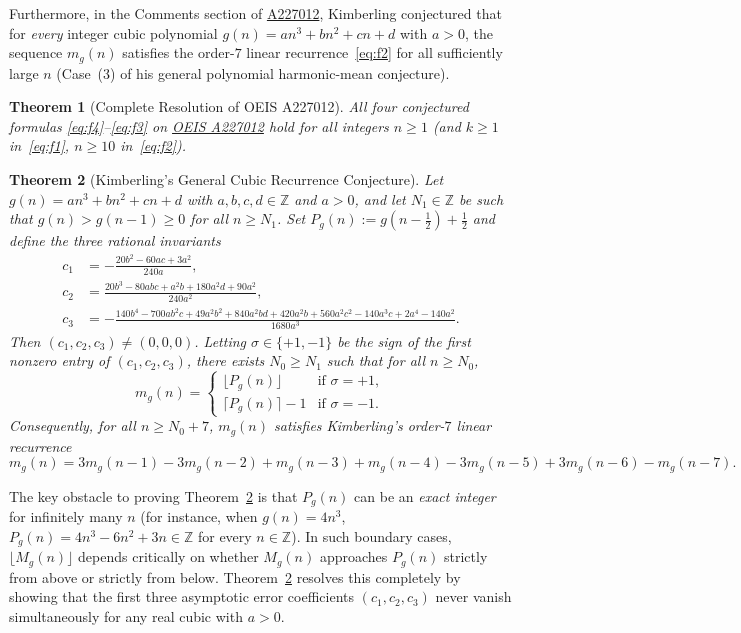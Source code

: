 \documentclass[11pt,a4paper]{article}
\newtheorem{theorem}{Theorem}
\theoremstyle{remark}
\begin{document}
Furthermore, in the Comments section of \href{https://oeis.org/A227012}{A227012}, Kimberling conjectured that for \emph{every} integer cubic polynomial $g(n) = an^3 + bn^2 + cn + d$ with $a > 0$, the sequence $m_g(n)$ satisfies the order-$7$ linear recurrence~\eqref{eq:f2} for all sufficiently large $n$ (Case~(3) of his general polynomial harmonic-mean conjecture).

\begin{theorem}[Complete Resolution of OEIS A227012]\label{thm:a227012}
All four conjectured formulas \eqref{eq:f4}--\eqref{eq:f3} on \href{https://oeis.org/A227012}{OEIS A227012} hold for all integers $n \ge 1$ (and $k \ge 1$ in~\eqref{eq:f1}, $n \ge 10$ in~\eqref{eq:f2}).
\end{theorem}

\begin{theorem}[Kimberling's General Cubic Recurrence Conjecture]\label{thm:general-cubic}
Let $g(n) = an^3 + bn^2 + cn + d$ with $a,b,c,d \in \mathbb{Z}$ and $a > 0$, and let $N_1 \in \mathbb{Z}$ be such that $g(n) > g(n-1) \ge 0$ for all $n \ge N_1$. Set $P_g(n) := g(n - \frac{1}{2}) + \frac{1}{2}$ and define the three rational invariants
\begin{align*}
  c_1 &= -\frac{20b^2 - 60ac + 3a^2}{240a}, \\
  c_2 &= \frac{20b^3 - 80abc + a^2b + 180a^2d + 90a^2}{240a^2}, \\
  c_3 &= -\frac{140b^4 - 700ab^2c + 49a^2b^2 + 840a^2bd + 420a^2b + 560a^2c^2 - 140a^3c + 2a^4 - 140a^2}{1680a^3}.
\end{align*}
Then $(c_1, c_2, c_3) \neq (0, 0, 0)$. Letting $\sigma \in \{+1, -1\}$ be the sign of the first nonzero entry of $(c_1, c_2, c_3)$, there exists $N_0 \ge N_1$ such that for all $n \ge N_0$,
\begin{equation}\label{eq:general-floor}
  m_g(n) = \begin{cases}
    \lfloor P_g(n) \rfloor & \text{if } \sigma = +1, \\
    \lceil P_g(n) \rceil - 1 & \text{if } \sigma = -1.
  \end{cases}
\end{equation}
Consequently, for all $n \ge N_0 + 7$, $m_g(n)$ satisfies Kimberling's order-$7$ linear recurrence
\[
  m_g(n) = 3m_g(n-1) - 3m_g(n-2) + m_g(n-3) + m_g(n-4) - 3m_g(n-5) + 3m_g(n-6) - m_g(n-7).
\]
\end{theorem}

The key obstacle to proving Theorem~\ref{thm:general-cubic} is that $P_g(n)$ can be an \emph{exact integer} for infinitely many $n$ (for instance, when $g(n) = 4n^3$, $P_g(n) = 4n^3 - 6n^2 + 3n \in \mathbb{Z}$ for every $n \in \mathbb{Z}$). In such boundary cases, $\lfloor M_g(n) \rfloor$ depends critically on whether $M_g(n)$ approaches $P_g(n)$ strictly from above or strictly from below. Theorem~\ref{thm:general-cubic} resolves this completely by showing that the first three asymptotic error coefficients $(c_1, c_2, c_3)$ never vanish simultaneously for any real cubic with $a > 0$.
\end{document}
